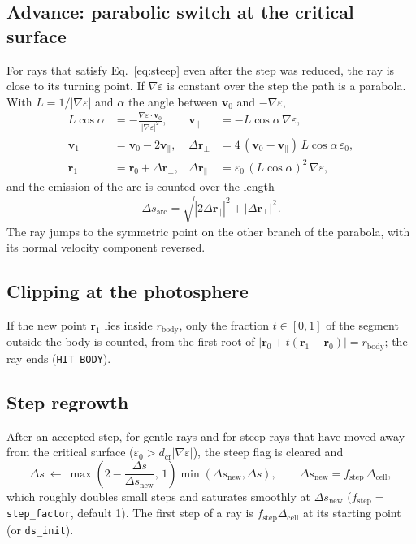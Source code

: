 \documentclass[11pt,a4paper]{article}
\newcommand{\code}[1]{\texttt{#1}}
\newcommand{\vect}[1]{\bm{#1}}
\begin{document}
\subsection{Advance: parabolic switch at the critical surface}\label{sec:parab}
For rays that satisfy Eq.~\eqref{eq:steep} even after the step was reduced, the ray is close to
its turning point. If $\nabla\varepsilon$ is constant over the step the path is a parabola. With
$L=1/|\nabla\varepsilon|$ and $\alpha$ the angle between $\vect v_0$ and $-\nabla\varepsilon$,
\begin{align}
  L\cos\alpha&=-\frac{\nabla\varepsilon\cdot\vect v_0}{|\nabla\varepsilon|^2}, &
  \vect v_\parallel&=-L\cos\alpha\,\nabla\varepsilon,\nonumber\\
  \vect v_1&=\vect v_0-2\vect v_\parallel, &
  \Delta\vect r_\perp&=4\,(\vect v_0-\vect v_\parallel)\,L\cos\alpha\,\varepsilon_0,\nonumber\\
  \vect r_1&=\vect r_0+\Delta\vect r_\perp, &
  \Delta\vect r_\parallel&=\varepsilon_0\,(L\cos\alpha)^2\,\nabla\varepsilon,
\end{align}
and the emission of the arc is counted over the length
\begin{equation}
  \Delta s_\text{arc}=\sqrt{|2\Delta\vect r_\parallel|^2+|\Delta\vect r_\perp|^2}.
\end{equation}
The ray jumps to the symmetric point on the other branch of the parabola, with its normal
velocity component reversed.

\subsection{Clipping at the photosphere}
If the new point $\vect r_1$ lies inside $r_\text{body}$, only the fraction
$t\in[0,1]$ of the segment outside the body is counted, from the first root of
$|\vect r_0+t(\vect r_1-\vect r_0)|=r_\text{body}$; the ray ends (\code{HIT\_BODY}).

\subsection{Step regrowth}
After an accepted step, for gentle rays and for steep rays that have moved away from the critical
surface ($\varepsilon_0>d_\text{cr}|\nabla\varepsilon|$), the steep flag is cleared and
\begin{equation}
  \Delta s\ \leftarrow\ \max\!\left(2-\frac{\Delta s}{\Delta s_\text{new}},\,1\right)
     \min(\Delta s_\text{new},\Delta s),\qquad \Delta s_\text{new}=f_\text{step}\,\Delta_\text{cell},
\end{equation}
which roughly doubles small steps and saturates smoothly at $\Delta s_\text{new}$
($f_\text{step}=$ \code{step\_factor}, default 1). The first step of a ray is
$f_\text{step}\Delta_\text{cell}$ at its starting point (or \code{ds\_init}).
\end{document}
